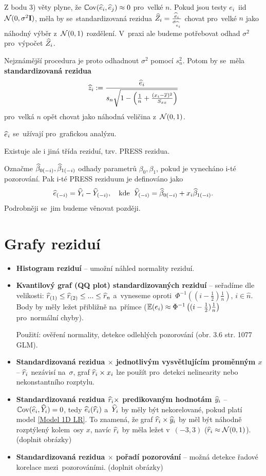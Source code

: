 \begin{remark}
	Z bodu 3) věty plyne, že $\mathbb{C}\mathrm{ov}(\widehat{e}_i, \widehat{e}_j) \approx 0$ pro~velké $n$. Pokud jsou testy $e_i$~iid~$\mathcal{N}(0,\sigma^2\textbf{I})$, měla by se~standardizovaná rezidua $\widehat{Z}_i = \frac{\widehat{e}_i}{\sigma_{\widehat{e}_i}}$ chovat pro~velké $n$ jako náhodný výběr z~$\mathcal{N}(0,1)$ rozdělení. V~praxi ale budeme potřebovat odhad $\sigma^2$ pro~výpočet $\widehat{Z}_i$.
	
	Nejznámější procedura je proto odhadnout $\sigma^2$ pomocí $s_n^2$. Potom by se~měla \textbf{standardizovaná rezidua}
	 $$
		\widehat{z}_i := \frac{\widehat{e}_i}{s_n \sqrt{1 - \left(\frac{1}{n} + \frac{(x_i - \overline{x})^2}{S_{xx}} \right)}}
	 $$
	pro~velká $n$ opět chovat jako náhodná veličina z~$\mathcal{N}(0,1)$.
\end{remark}

\begin{remark}
	 $\widehat{e}_i$ se~užívají pro~grafickou analýzu.
	
	Existuje ale i jiná třída reziduí, tzv. PRESS rezidua.
	
	Označme $\widehat{\beta}_{0(-i)}, \widehat{\beta}_{1(-i)}$ odhady parametrů $\beta_0, \beta_1$, pokud je vynecháno i-té pozorování. Pak i-té PRESS reziduum je definováno jako
	 $$
		\widehat{e}_{(-i)} = \widehat{Y}_i - \widehat{Y}_{(-i)}, \quad \text{kde \;} \widehat{Y}_{(-i)} = \widehat{\beta}_{0(-i)} + x_i \widehat{\beta}_{1(-i)}.
	 $$
	Podrobněji se~jim budeme věnovat později.
\end{remark}

\section{Grafy reziduí}
\begin{itemize}
	\item \textbf{Histogram reziduí} -- umožní náhled normality reziduí.
	\item \textbf{Kvantilový graf (QQ plot) standardizovaných reziduí} -- seřadíme dle velikosti: $\widehat{r}_{(1)} \leq \widehat{r}_{(2)} \leq... \leq \widehat{r}_n$ a~vyneseme oproti~$\Phi^{-1}\left((i - \frac{1}{2}) \frac{1}{n} \right)$, $i  \in\widehat{n} $. Body by měly ležet přibližně na~přímce ($\mathbb{E} (e_i) \approx \Phi^{-1}\left((i - \frac{1}{2}) \frac{1}{n} \right)$ pro~normální chyby).
	
	Použití: ověření normality, detekce odlehlých pozorování (obr. 3.6 str. 1077 GLM).
	\item \textbf{Standardizovaná rezidua $\times$ jednotlivým vysvětlujícím proměnným $x$} -- $\widehat{r}_i$ nezávisí na~$\sigma$, graf $\widehat{r}_i \times x_i$ lze použít pro~detekci nelinearity nebo nekonstantního rozptylu.
	\item \textbf{Standardizovaná rezidua $\widehat{r}_i \times$ predikovaným hodnotám $\widehat{y}_i$} -- $\mathbb{C}\mathrm{ov}(\widehat{e}_i, \widehat{Y}_i) = 0$, tedy $\widehat{e}_i(\widehat{r}_i)$ a~$\widehat{Y}_i$ by měly být nekorelované, pokud platí model \eqref{Model 1D LR}. To znamená, že graf $\widehat{r}_i \times \widehat{y}_i$ by měl být náhodně rozptýlený kolem~osy $x$, navíc $\widehat{r}_i$ by měla ležet v~$(-3,3)$ ($ \widehat{r}_i \approx \mathcal{N}(0,1) $).
	(doplnit obrázky)
	\item \textbf{Standardizovaná rezidua $\times$ pořadí pozorování} -- možná detekce řadové korelace mezi~pozorováními.
	(doplnit obrázky)
	
\end{itemize}


